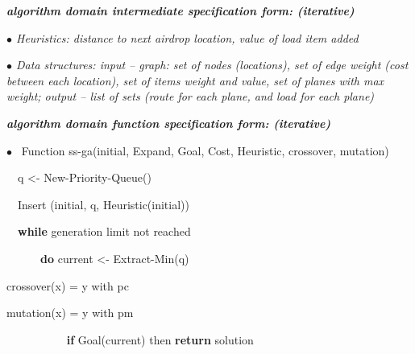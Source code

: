 \documentclass[12pt]{article}
\renewcommand{\_}{\kern-1.5pt\textunderscore\kern-1.5pt}
\begin{document}
\setlength{\parskip}{0.0pt}
\begin{adjustwidth}{0.0in}{-0.01in}
\tab \textbf{\textit{algorithm domain intermediate speciﬁcation form: (iterative)}}\par

\end{adjustwidth}

\begin{adjustwidth}{0.32in}{-0.01in}
\textit{$\bullet$  Heuristics: distance to next airdrop location, value of load item added}\par

\end{adjustwidth}

\begin{adjustwidth}{0.32in}{-0.01in}
\textit{$\bullet$  Data structures: input – graph: set of nodes (locations), set of edge weight (cost between each location), set of items weight and value, set of planes with max weight; output – list of sets (route for each plane, and load for each plane)}\par

\end{adjustwidth}


\vspace{\baselineskip}
\begin{adjustwidth}{0.0in}{-0.01in}
\textbf{\textit{algorithm domain function speciﬁcation form:  (iterative)}}\par

\end{adjustwidth}

\textit{$\bullet$  }\  Function ss-ga(initial, Expand, Goal, Cost, Heuristic, crossover, mutation)\par

\ \  q <- New-Priority-Queue()\par

\ \  Insert (initial, q, Heuristic(initial))\par

\ \  \textbf{while} generation limit not reached\par

\ \ \ \ \ \  \textbf{do} current <- Extract-Min(q)\par

\tab crossover(x) = y with pc\par

\tab mutation(x) = y with pm\par

\ \ \ \ \ \ \ \ \ \  \textbf{ if} Goal(current) then \textbf{return} solution\par
\end{document}
